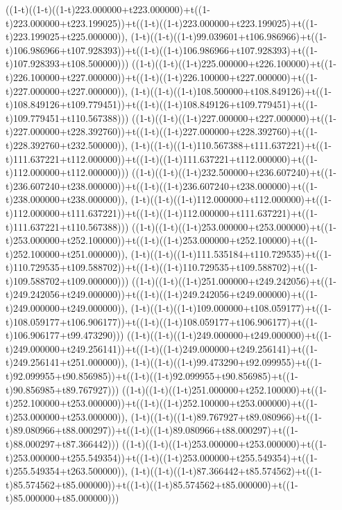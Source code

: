 ((1-t)((1-t)((1-t)223.000000+t223.000000)+t((1-t)223.000000+t223.199025))+t((1-t)((1-t)223.000000+t223.199025)+t((1-t)223.199025+t225.000000)),                                     (1-t)((1-t)((1-t)99.039601+t106.986966)+t((1-t)106.986966+t107.928393))+t((1-t)((1-t)106.986966+t107.928393)+t((1-t)107.928393+t108.500000)))
((1-t)((1-t)((1-t)225.000000+t226.100000)+t((1-t)226.100000+t227.000000))+t((1-t)((1-t)226.100000+t227.000000)+t((1-t)227.000000+t227.000000)),                                     (1-t)((1-t)((1-t)108.500000+t108.849126)+t((1-t)108.849126+t109.779451))+t((1-t)((1-t)108.849126+t109.779451)+t((1-t)109.779451+t110.567388)))
((1-t)((1-t)((1-t)227.000000+t227.000000)+t((1-t)227.000000+t228.392760))+t((1-t)((1-t)227.000000+t228.392760)+t((1-t)228.392760+t232.500000)),                                     (1-t)((1-t)((1-t)110.567388+t111.637221)+t((1-t)111.637221+t112.000000))+t((1-t)((1-t)111.637221+t112.000000)+t((1-t)112.000000+t112.000000)))
((1-t)((1-t)((1-t)232.500000+t236.607240)+t((1-t)236.607240+t238.000000))+t((1-t)((1-t)236.607240+t238.000000)+t((1-t)238.000000+t238.000000)),                                     (1-t)((1-t)((1-t)112.000000+t112.000000)+t((1-t)112.000000+t111.637221))+t((1-t)((1-t)112.000000+t111.637221)+t((1-t)111.637221+t110.567388)))
((1-t)((1-t)((1-t)253.000000+t253.000000)+t((1-t)253.000000+t252.100000))+t((1-t)((1-t)253.000000+t252.100000)+t((1-t)252.100000+t251.000000)),                                     (1-t)((1-t)((1-t)111.535184+t110.729535)+t((1-t)110.729535+t109.588702))+t((1-t)((1-t)110.729535+t109.588702)+t((1-t)109.588702+t109.000000)))
((1-t)((1-t)((1-t)251.000000+t249.242056)+t((1-t)249.242056+t249.000000))+t((1-t)((1-t)249.242056+t249.000000)+t((1-t)249.000000+t249.000000)),                                     (1-t)((1-t)((1-t)109.000000+t108.059177)+t((1-t)108.059177+t106.906177))+t((1-t)((1-t)108.059177+t106.906177)+t((1-t)106.906177+t99.473290)))
((1-t)((1-t)((1-t)249.000000+t249.000000)+t((1-t)249.000000+t249.256141))+t((1-t)((1-t)249.000000+t249.256141)+t((1-t)249.256141+t251.000000)),                                     (1-t)((1-t)((1-t)99.473290+t92.099955)+t((1-t)92.099955+t90.856985))+t((1-t)((1-t)92.099955+t90.856985)+t((1-t)90.856985+t89.767927)))
((1-t)((1-t)((1-t)251.000000+t252.100000)+t((1-t)252.100000+t253.000000))+t((1-t)((1-t)252.100000+t253.000000)+t((1-t)253.000000+t253.000000)),                                     (1-t)((1-t)((1-t)89.767927+t89.080966)+t((1-t)89.080966+t88.000297))+t((1-t)((1-t)89.080966+t88.000297)+t((1-t)88.000297+t87.366442)))
((1-t)((1-t)((1-t)253.000000+t253.000000)+t((1-t)253.000000+t255.549354))+t((1-t)((1-t)253.000000+t255.549354)+t((1-t)255.549354+t263.500000)),                                     (1-t)((1-t)((1-t)87.366442+t85.574562)+t((1-t)85.574562+t85.000000))+t((1-t)((1-t)85.574562+t85.000000)+t((1-t)85.000000+t85.000000)))
